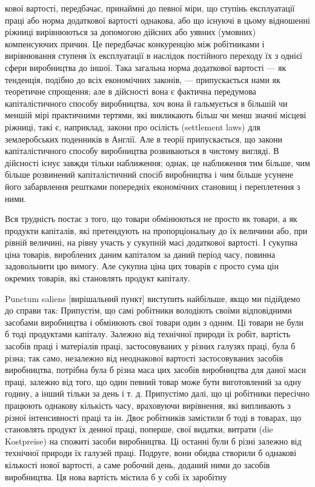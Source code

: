 кової вартості, передбачає, принаймні до певної міри, що ступінь
експлуатації праці або норма додаткової вартості однакова, або
що існуючі в цьому відношенні ріжниці вирівнюються за допомогою
дійсних або уявних (умовних) компенсуючих причин.
Це передбачає конкуренцію між робітниками і вирівнювання
ступеня їх експлуатації в наслідок постійного переходу їх
з однієї сфери виробництва до іншої. Така загальна норма додаткової
вартості — як тенденція, подібно до всіх економічних
законів, — припускається нами як теоретичне спрощення; але
в дійсності вона є фактична передумова капіталістичного способу
виробництва, хоч вона й гальмується в більшій чи меншій
мірі практичними тертями, які викликають більш чи менш
значні місцеві ріжниці, такі є, наприклад, закони про осілість
(settlement laws) для землеробських поденників в Англії. Але
в теорії припускається, що закони капіталістичного способу
виробництва розвиваються в чистому вигляді. В дійсності існує
завжди тільки наближення; однак, це наближення тим більше,
чим більше розвинений капіталістичний спосіб виробництва і чим
більше усунене його забарвлення рештками попередніх економічних
становищ і переплетення з ними.

Вся трудність постає з того, що товари обмінюються не
просто як товари, а як продукти капіталів, які претендують
на пропорціональну до їх величини або, при рівній величині, на
рівну участь у сукупній масі додаткової вартості. І сукупна
ціна товарів, вироблених даним капіталом за даний період часу,
повинна задовольнити цю вимогу. Але сукупна ціна цих товарів
є просто сума цін окремих товарів, які становлять продукт
капіталу.

Punctum saliens [вирішальний пункт] виступить найбільше, якщо
ми підійдемо до справи так: Припустім, що самі робітники
володіють своїми відповідними засобами виробництва і обмінюють
свої товари один з одним. Ці товари не були б тоді
продуктами капіталу. Залежно від технічної природи їх робіт,
вартість засобів праці і матеріалів праці, застосовуваних у різних
галузях праці, була б різна; так само, незалежно від неоднакової
вартості застосовуваних засобів виробництва, потрібна була б
різна маса цих засобів виробництва для даної маси праці, залежно
від того, що один певний товар може бути виготовлений
за одну годину, а інший тільки за день і т. д. Припустімо
далі, що ці робітники пересічно працюють однакову кількість
часу, враховуючи вирівнення, які випливають з різної інтенсивності
праці та ін. Двоє робітників замістили б тоді в товарах,
що становлять продукт їх денної праці, поперше, свої
видатки, витрати (die Kostpreise) на спожиті засоби виробництва.
Ці останні були б різні залежно від технічної природи їх галузей
праці. Подруге, вони обидва створили б однакові кількості
нової вартості, а саме робочий день, доданий ними до засобів
виробництва. Ця нова вартість містила б у собі їх заробітну
